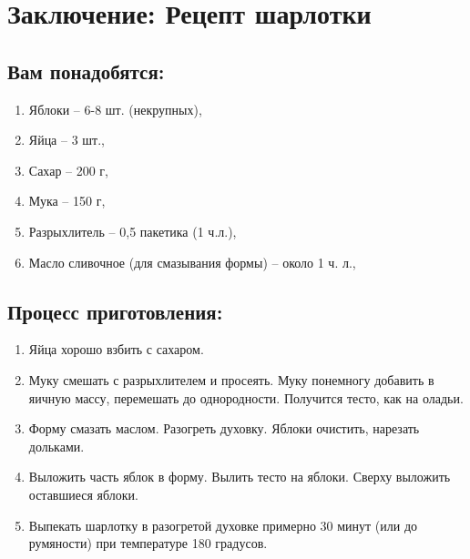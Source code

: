 \section{Заключение: Рецепт шарлотки}

    \subsection{Вам понадобятся:}
        \begin{enumerate}
            \item Яблоки -- 6-8 шт. (некрупных),
            \item Яйца -- 3 шт.,
            \item Сахар -- 200 г,
            \item Мука -- 150 г,
            \item Разрыхлитель -- 0,5 пакетика (1 ч.л.),           
            \item Масло сливочное (для смазывания формы) -- около 1 ч. л.,
        \end{enumerate}

    \subsection{Процесс приготовления:}
        \begin{enumerate}
            \item Яйца хорошо взбить с сахаром.            
            
            \item Муку смешать с разрыхлителем и просеять. Муку понемногу добавить в яичную массу, перемешать до однородности. Получится тесто, как на оладьи.
            
            \item Форму смазать маслом. Разогреть духовку. Яблоки очистить, нарезать дольками.
            
            \item Выложить часть яблок в форму. Вылить тесто на яблоки. Сверху выложить оставшиеся яблоки.
            
            \item Выпекать шарлотку в разогретой духовке примерно 30 минут (или до румяности) при температуре 180 градусов.
        \end{enumerate}